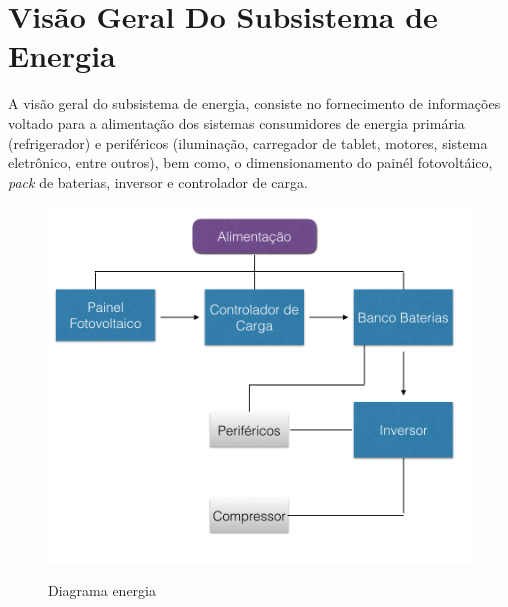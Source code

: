 \section{Visão Geral Do Subsistema de Energia}

A visão geral do subsistema de energia, consiste no fornecimento de informações voltado para a alimentação dos sistemas consumidores de energia primária (refrigerador) e periféricos (iluminação, carregador de tablet, motores, sistema eletrônico, entre outros), bem como, o dimensionamento do painél fotovoltáico,  \textit{pack} de baterias, inversor e controlador de carga. 

\begin{figure}[H]
	\centering
    \caption{Diagrama energia}
    \includegraphics[width=\textwidth]{figuras/diagrama_energia}
    \label{fig:diagrama_energia}
\end{figure}
